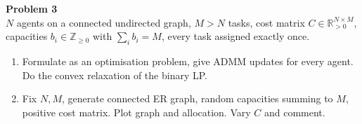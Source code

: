 \documentclass[a4paper, 11pt]{article}
\newenvironment{problem}[2][Problem]
    { \begin{mdframed}[backgroundcolor=gray!20] \textbf{#1 #2} \\}
    {  \end{mdframed}}
\begin{document}
\begin{problem}{3}
$N$ agents on a connected undirected graph, $M > N$ tasks, cost matrix $C \in \mathbb{R}^{N \times M}_{>0}$, capacities $b_i \in \mathbb{Z}_{\geq 0}$ with $\sum_i b_i = M$, every task assigned exactly once.
\begin{enumerate}[nosep]
    \item Formulate as an optimisation problem, give ADMM updates for every agent. Do the convex relaxation of the binary LP.
    \item Fix $N, M$, generate connected ER graph, random capacities summing to $M$, positive cost matrix. Plot graph and allocation. Vary $C$ and comment.
\end{enumerate}
\end{problem}
\end{document}
